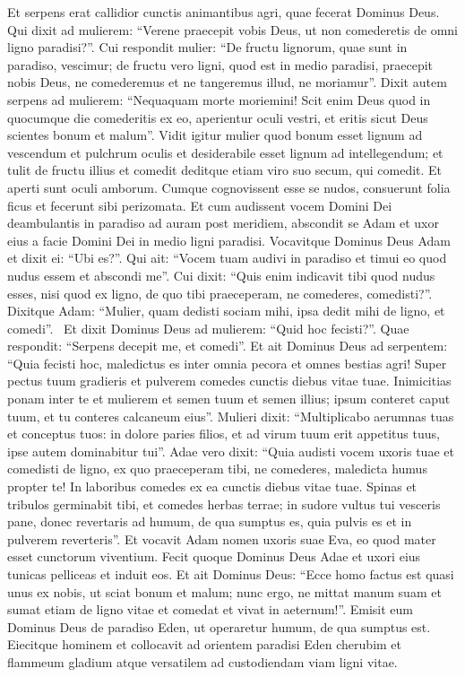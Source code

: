 \begin{biblechapter}
\begin{biblechapter}
\begin{biblechapter}
\verse Et serpens erat callidior cunctis animantibus agri, quae fecerat Dominus Deus. Qui dixit ad mulierem: “Verene praecepit vobis Deus, ut non comederetis de omni ligno paradisi?”. 
\verse Cui respondit mulier: “De fructu lignorum, quae sunt in paradiso, vescimur; 
\verse de fructu vero ligni, quod est in medio paradisi, praecepit nobis Deus, ne comederemus et ne tangeremus illud, ne moriamur”. 
\verse Dixit autem serpens ad mulierem: “Nequaquam morte moriemini! 
 \verse Scit enim Deus quod in quocumque die comederitis ex eo, aperientur oculi vestri, et eritis sicut Deus scientes bonum et malum”.
 \verse Vidit igitur mulier quod bonum esset lignum ad vescendum et pulchrum oculis et desiderabile esset lignum ad intellegendum; et tulit de fructu illius et comedit deditque etiam viro suo secum, qui comedit. 
\verse Et aperti sunt oculi amborum. Cumque cognovissent esse se nudos, consuerunt folia ficus et fecerunt sibi perizomata. 
\verse Et cum audissent vocem Domini Dei deambulantis in paradiso ad auram post meridiem, abscondit se Adam et uxor eius a facie Domini Dei in medio ligni paradisi. 
\verse Vocavitque Dominus Deus Adam et dixit ei: “Ubi es?”. 
\verse Qui ait: “Vocem tuam audivi in paradiso et timui eo quod nudus essem et abscondi me”. 
\verse Cui dixit: “Quis enim indicavit tibi quod nudus esses, nisi quod ex ligno, de quo tibi praeceperam, ne comederes, comedisti?”. 
 \verse Dixitque Adam: “Mulier, quam dedisti sociam mihi, ipsa dedit mihi de ligno, et comedi”. 
 \verse Et dixit Dominus Deus ad mulierem: “Quid hoc fecisti?”. Quae respondit: “Serpens decepit me, et comedi”.
 \verse Et ait Dominus Deus ad serpentem:
 “Quia fecisti hoc, maledictus es
 inter omnia pecora
 et omnes bestias agri!
 Super pectus tuum gradieris
 et pulverem comedes cunctis
 diebus vitae tuae.
 \verse Inimicitias ponam inter te et mulierem
 et semen tuum et semen illius;
 ipsum conteret caput tuum,
 et tu conteres calcaneum eius”.
 \verse Mulieri dixit:
 “Multiplicabo aerumnas tuas
 et conceptus tuos:
 in dolore paries filios,
 et ad virum tuum erit appetitus tuus,
 ipse autem dominabitur tui”.
 \verse Adae vero dixit: “Quia audisti vocem uxoris tuae et comedisti de ligno, ex quo praeceperam tibi, ne comederes,
 maledicta humus propter te!
 In laboribus comedes ex ea
 cunctis diebus vitae tuae.
 \verse Spinas et tribulos germinabit tibi,
 et comedes herbas terrae;
 \verse in sudore vultus tui vesceris pane,
 donec revertaris ad humum,
 de qua sumptus es,
 quia pulvis es et in pulverem reverteris”.
 \verse Et vocavit Adam nomen uxoris suae Eva, eo quod mater esset cunctorum viventium.
 \verse Fecit quoque Dominus Deus Adae et uxori eius tunicas pelliceas et induit eos. 
\verse Et ait Dominus Deus: “Ecce homo factus est quasi unus ex nobis, ut sciat bonum et malum; nunc ergo, ne mittat manum suam et sumat etiam de ligno vitae et comedat et vivat in aeternum!”.
\verse Emisit eum Dominus Deus de paradiso Eden, ut operaretur humum, de qua sumptus est. 
\verse Eiecitque hominem et collocavit ad orientem paradisi Eden cherubim et flammeum gladium atque versatilem ad custodiendam viam ligni vitae.
 

\end{biblechapter}
\end{biblechapter}
\end{biblechapter}
